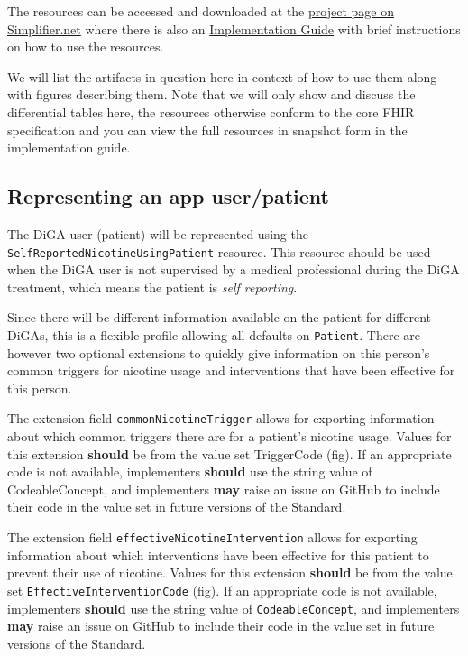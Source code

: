 \documentclass[12px]{report}
\def\code#1{\texttt{#1}} %
\begin{document}
The resources can be accessed and downloaded at the \href{https://simplifier.net/treat-nicotine-usage-diga}{project page on Simplifier.net} where there is also an \href{https://simplifier.net/guide/self-reported-nicotine-usage-diga/home}{Implementation Guide} \cite{ig} with brief instructions on how to use the resources.

We will list the artifacts in question here in context of how to use them along with figures describing them. Note that we will only show and discuss the differential tables here, the resources otherwise conform to the core FHIR specification and you can view the full resources in snapshot form in the implementation guide.

\subsection{Representing an app user/patient}

The DiGA user (patient) will be represented using the \code{SelfReportedNicotineUsingPatient} resource. This resource should be used when the DiGA user is not supervised by a medical professional during the DiGA treatment, which means the
patient is \textit{self reporting}.

Since there will be different information available on the patient for different DiGAs, this is a flexible profile allowing all defaults on \code{Patient}. 
There are however two optional extensions to quickly give information on this person's common triggers for nicotine usage and interventions that have been effective for this person.


The extension field \code{commonNicotineTrigger} allows for exporting information about which common triggers there are for a patient's nicotine usage. 
Values for this extension \textbf{should} be from the value set TriggerCode (fig). If an appropriate code is not available, implementers \textbf{should} use the string value of CodeableConcept, 
and implementers \textbf{may} raise an issue on GitHub \cite{github} to include their code in the value set in future versions of the Standard.




The extension field \code{effectiveNicotineIntervention} allows for exporting information about which interventions have been effective for this patient to prevent their use of nicotine.
Values for this extension \textbf{should} be from the value set \code{EffectiveInterventionCode} (fig). If an appropriate code is not available, implementers \textbf{should} use the string value of \code{CodeableConcept}, 
and implementers \textbf{may} raise an issue on GitHub \cite{github} to include their code in the value set in future versions of the Standard.
\end{document}
